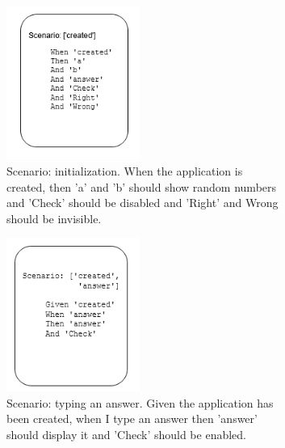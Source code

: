 \begin{figure}[H]
   
    \caption{Gherkin scenario templates and sample human written scenarios based on the templates }
    \label{fig:eval_gherkin}
    \centering
    \begin{subfigure}[t]{0.48\textwidth}
         \centering
         \includegraphics[width=0.48\textwidth]{images/scenarios_1.png}
         \caption{Scenario: initialization. When the application is created, then 'a' and 'b' should show random numbers and 'Check' should be disabled and 'Right' and Wrong should be invisible.}
    \end{subfigure}\hfill%
    \begin{subfigure}[t]{0.48\textwidth}
        \centering
        \includegraphics[width=0.48\textwidth]{images/scenarios_2.png}
        \caption{Scenario: typing an answer. Given the application has been created, when I type an answer then 'answer' should display it and 'Check' should be enabled.}
    \end{subfigure}\hfill%
    \begin{subfigure}[t]{0.48\textwidth}
        \centering

\end{subfigure}
\end{figure}
